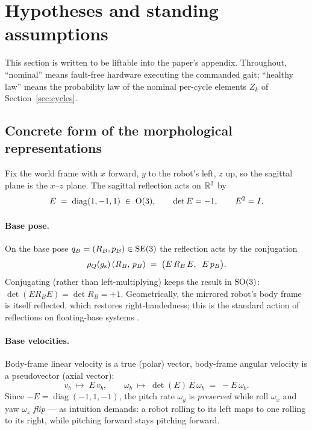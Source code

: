 \section{Hypotheses and standing assumptions}
\label{sec:assumptions}

This section is written to be liftable into the paper's appendix. Throughout,
``nominal'' means fault-free hardware executing the commanded gait;
``healthy law'' means the probability law of the nominal per-cycle elements
$Z_k$ of Section~\ref{sec:cycles}.

\subsection{Concrete form of the morphological representations}
\label{sec:reps}

Fix the world frame with $x$ forward, $y$ to the robot's left, $z$ up, so the
sagittal plane is the $x$--$z$ plane. The sagittal reflection acts on
$\mathbb{R}^3$ by
\[
  E \;=\; \operatorname{diag}(1,-1,1) \;\in\; \mathrm{O}(3),
  \qquad \det E = -1,\qquad E^2 = I .
\]

\paragraph{Base pose.}
On the base pose $q_B = (R_B, p_B) \in \mathrm{SE}(3)$ the reflection acts by the
conjugation
\begin{equation}
  \label{eq:base-action}
  \rho_{Q}(g_{\mathrm{s}})\,(R_B,\, p_B) \;=\; \bigl(E\,R_B\,E,\;\; E\,p_B\bigr).
\end{equation}
Conjugating (rather than left-multiplying) keeps the result in $\mathrm{SO}(3)$:
$\det(E R_B E) = \det R_B = +1$. Geometrically, the mirrored robot's body
frame is itself reflected, which restores right-handedness; this is the
standard action of reflections on floating-base systems
\cite{ordonez2025morphological}.

\paragraph{Base velocities.}
Body-frame linear velocity is a true (polar) vector, body-frame angular
velocity is a pseudovector (axial vector):
\begin{equation}
  \label{eq:twist-action}
  v_b \;\longmapsto\; E\,v_b,
  \qquad
  \omega_b \;\longmapsto\; \det(E)\,E\,\omega_b \;=\; -E\,\omega_b .
\end{equation}
Since $-E = \operatorname{diag}(-1,1,-1)$, the pitch rate $\omega_y$ is
\emph{preserved} while roll $\omega_x$ and yaw $\omega_z$ \emph{flip} --- as
intuition demands: a robot rolling to its left maps to one rolling to its
right, while pitching forward stays pitching forward.

